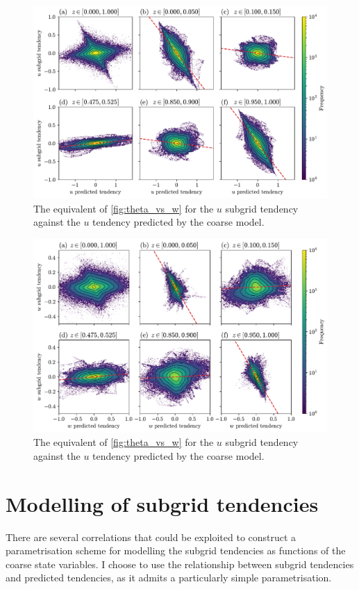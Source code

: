 \documentclass[../main.tex]{subfiles}
\begin{document}
\begin{figure}[ht]
    \centering
    \includegraphics[width=0.95\linewidth]{figures/u_subgrid_vs_pred_tend.pdf}
    \caption{
        The equivalent of \cref{fig:theta_vs_w} for the $u$ subgrid
        tendency against the $u$ tendency predicted by the coarse model.
    }
    \label{fig:u_subgrid_vs_pred_tend}
\end{figure}

\begin{figure}[ht]
    \centering
    \includegraphics[width=0.95\linewidth]{figures/w_subgrid_vs_pred_tend.pdf}
    \caption{
        The equivalent of \cref{fig:theta_vs_w} for the $u$ subgrid
        tendency against the $u$ tendency predicted by the coarse model.
    }
    \label{fig:w_subgrid_vs_pred_tend}
\end{figure}


\section{Modelling of subgrid tendencies}
\label{sec:subgrid_modelling}
There are several correlations that could be exploited to construct a
parametrisation scheme for modelling the subgrid tendencies as functions of the
coarse state variables. I choose to use the relationship between subgrid
tendencies and predicted tendencies, as it admits a particularly simple
parametrisation.
\end{document}
